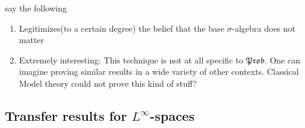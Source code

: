 \documentclass[a4paper]{amsproc}
\theoremstyle{plain}
\theoremstyle{definition}
\theoremstyle{remark}
\numberwithin{equation}{section}
\begin{document}

say the following
\begin{enumerate}
    \item Legitimizes(to a certain degree) the belief that the base $\sigma$-algebra does not matter
    \item Extremely interesting: This technique is not at all specific to $\mathfrak{Prob}$. One can imagine proving similar results in a wide variety of other contexts. Classical Model theory could not prove this kind of stuff?
\end{enumerate}

\subsection{Transfer results for $L^\infty$-spaces}
\end{document}
